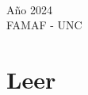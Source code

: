 \documentclass[a4paper,12pt,twoside,spanish,reqno,dottedtoc]{scrbook}
\begin{document}
    
    \begin{titlepage}
        
        \begin{addmargin}[-1cm]{-3cm} 
            \begin{center} 
                \large
                
                \hfill
                \vfill
                
                \begingroup
                \color{Maroon} \\ \bigskip %
                \endgroup
                
                \vfill
                
        
                
                Año 2024   \\ FAMAF  - UNC\\ \medskip %
                
                
                \vfill
                
            \end{center}
        \end{addmargin}
        
    \end{titlepage}
    
    
    \begingroup

    \let\clearpage\relax
    \let\cleardoublepage\relax
    \let\cleardoublepage\relax
    
    \chapter*{Leer}
    
    
\end{document}
